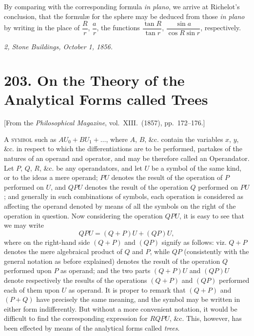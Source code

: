 \documentclass[12pt,a4paper]{article}
\theoremstyle{definition}
\begin{document}
\medskip


\medskip

By comparing with the corresponding formula \textit{in plano}, we arrive at Richelot's
conclusion, that the formul\ae{} for the sphere may be deduced from those \textit{in plano} by
writing in the place of $\dfrac{R}{r}$, $\dfrac{a}{r}$, the functions $\dfrac{\tan R}{\tan r}$, $\dfrac{\sin a}{\cos R \sin r}$, respectively.

\bigskip

\noindent\textit{2, Stone Buildings, October 1, 1856.}

\newpage


\section*{203. On the Theory of the Analytical Forms called Trees}

\begin{center}
[From the \textit{Philosophical Magazine}, vol.~XIII.~(1857), pp.~172--176.]
\end{center}

\bigskip

A \textsc{symbol} such as $AU_0 + BU_1 + \ldots$, where $A$, $B$, \&c. contain the variables $x$, $y$, \&c. in
respect to which the differentiations are to be performed, partakes of the natures
of an operand and operator, and may be therefore called an Operandator. Let
$P$, $Q$, $R$, \&c. be any operandators, and let $U$ be a symbol of the same kind, or to
the ideas a mere operand; $PU$ denotes the result of the operation of $P$ performed on
$U$, and $QPU$ denotes the result of the operation $Q$ performed on $PU$; and generally
in such combinations of symbols, each operation is considered as affecting the operand
denoted by means of all the symbols on the right of the operation in question. Now
considering the operation $QPU$, it is easy to see that we may write
\[
QPU = (Q + P)U + (QP)U,
\]
where on the right-hand side $(Q + P)$ and $(QP)$ signify as follows: viz. $Q + P$ denotes
the mere algebraical product of $Q$ and $P$, while $QP$ (consistently with the general
notation as before explained) denotes the result of the operation $Q$ performed upon
$P$ as operand; and the two parts $(Q + P)U$ and $(QP)U$ denote respectively the
results of the operations $(Q + P)$ and $(QP)$ performed each of them upon $U$ as operand.
It is proper to remark that $(Q + P)$ and $(P + Q)$ have precisely the same meaning,
and the symbol may be written in either form indifferently. But without a more
convenient notation, it would be difficult to find the corresponding expression for
$RQPU$, \&c. This, however, has been effected by means of the analytical forms
called \textit{trees}.
\end{document}
